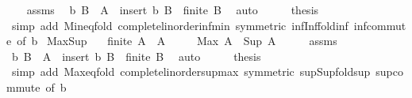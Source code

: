 \begin{isabellebody}
\ \ \isamarkupfalse%
\ assms\ \isamarkupfalse%
\ b\ B\ \ {\isachardoublequoteopen}A\ {\isacharequal}{\kern0pt}\ insert\ b\ B{\isachardoublequoteclose}\ \ {\isachardoublequoteopen}finite\ B{\isachardoublequoteclose}\ \isamarkupfalse%
\ auto\isanewline
\ \ \isamarkupfalse%
\ \isamarkupfalse%
\ {\isacharquery}{\kern0pt}thesis\isanewline
\ \ \ \ \isamarkupfalse%
\ {\isacharparenleft}{\kern0pt}simp\ add{\isacharcolon}{\kern0pt}\ Min{\isachardot}{\kern0pt}eq{\isacharunderscore}{\kern0pt}fold\ complete{\isacharunderscore}{\kern0pt}linorder{\isacharunderscore}{\kern0pt}inf{\isacharunderscore}{\kern0pt}min\ {\isacharbrackleft}{\kern0pt}symmetric{\isacharbrackright}{\kern0pt}\ inf{\isacharunderscore}{\kern0pt}Inf{\isacharunderscore}{\kern0pt}fold{\isacharunderscore}{\kern0pt}inf\ inf{\isachardot}{\kern0pt}commute\ {\isacharbrackleft}{\kern0pt}of\ b{\isacharbrackright}{\kern0pt}{\isacharparenright}{\kern0pt}\isanewline
{}\isamarkupfalse%
%
\endisatagproof
{\isafoldproof}%
%
\isadelimproof
\isanewline
%
\endisadelimproof
\isanewline
{}\isamarkupfalse%
\ Max{\isacharunderscore}{\kern0pt}Sup{\isacharcolon}{\kern0pt}\isanewline
\ \ \ {\isachardoublequoteopen}finite\ A{\isachardoublequoteclose}\ \ {\isachardoublequoteopen}A\ {\isasymnoteq}\ {\isacharbraceleft}{\kern0pt}{\isacharbraceright}{\kern0pt}{\isachardoublequoteclose}\isanewline
\ \ \ {\isachardoublequoteopen}Max\ A\ {\isacharequal}{\kern0pt}\ Sup\ A{\isachardoublequoteclose}\isanewline
%
\isadelimproof
%
\endisadelimproof
%
\isatagproof
{}\isamarkupfalse%
\ {\isacharminus}{\kern0pt}\isanewline
\ \ \isamarkupfalse%
\ assms\ \isamarkupfalse%
\ b\ B\ \ {\isachardoublequoteopen}A\ {\isacharequal}{\kern0pt}\ insert\ b\ B{\isachardoublequoteclose}\ \ {\isachardoublequoteopen}finite\ B{\isachardoublequoteclose}\ \isamarkupfalse%
\ auto\isanewline
\ \ \isamarkupfalse%
\ \isamarkupfalse%
\ {\isacharquery}{\kern0pt}thesis\isanewline
\ \ \ \ \isamarkupfalse%
\ {\isacharparenleft}{\kern0pt}simp\ add{\isacharcolon}{\kern0pt}\ Max{\isachardot}{\kern0pt}eq{\isacharunderscore}{\kern0pt}fold\ complete{\isacharunderscore}{\kern0pt}linorder{\isacharunderscore}{\kern0pt}sup{\isacharunderscore}{\kern0pt}max\ {\isacharbrackleft}{\kern0pt}symmetric{\isacharbrackright}{\kern0pt}\ sup{\isacharunderscore}{\kern0pt}Sup{\isacharunderscore}{\kern0pt}fold{\isacharunderscore}{\kern0pt}sup\ sup{\isachardot}{\kern0pt}commute\ {\isacharbrackleft}{\kern0pt}of\ b{\isacharbrackright}{\kern0pt}{\isacharparenright}{\kern0pt}\isanewline

\end{isabellebody}
